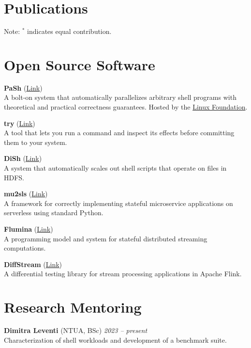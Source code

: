 \documentclass[margin]{res}
\begin{document}
\begin{resume}
\section{Publications}



Note: $^*$ indicates equal contribution.

\section{Open Source Software}

\textbf{PaSh} (\href{https://github.com/binpash/pash}{Link}) \\
A bolt-on system that automatically parallelizes arbitrary shell programs with theoretical and practical correctness guarantees. 
Hosted by the \href{https://www.linuxfoundation.org/press-release/linux-foundation-to-host-the-pash-project-accelerating-shell-scripting-with-automated-parallelization-for-industrial-use-cases/}{Linux Foundation}.

\textbf{try} (\href{https://github.com/binpash/try}{Link}) \\
A tool that lets you run a command and inspect its effects before committing them to your system.

\textbf{DiSh} (\href{https://github.com/binpash/dish}{Link}) \\
A system that automatically scales out shell scripts that operate on files in HDFS.

\textbf{mu2sls} (\href{https://github.com/eniac/mu2sls}{Link}) \\
A framework for correctly implementing stateful microservice applications on serverless using standard Python. 

\textbf{Flumina} (\href{https://github.com/angelhof/flumina}{Link}) \\
A programming model and system for stateful distributed streaming computations.

\textbf{DiffStream} (\href{https://github.com/fniksic/diffstream}{Link}) \\
A differential testing library for stream processing applications in Apache Flink.

\section{Research Mentoring}

\textbf{Dimitra Leventi} (NTUA, BSc) \hfill {\em 2023 -- present} \\
Characterization of shell workloads and development of a benchmark suite.


\end{resume}
\end{document}

